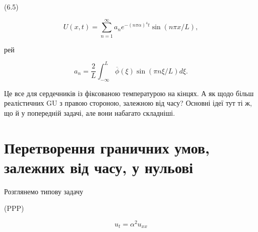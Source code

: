 \documentclass[
  ukrainian,
]{article}
\begin{document}
(6.5)

\[
U(x, t) = \sum_{n=1}^{\infty} a_n e^{-(n\pi\alpha)^4 t} \sin(n\pi x/L),
\]

рей

\[
a_n = \frac{2}{L} \int_{-\infty}^{L} \overline{\phi}(\xi) \sin(\pi n\xi/L) d\xi.
\]

Це все для сердечників із фіксованою температурою на кінцях. А як щодо
більш реалістичних GU з правою стороною, залежною від часу? Основні ідеї
тут ті ж, що й у попередній задачі, але вони набагато складніші.

\section{Перетворення граничних умов, залежних від часу, у
нульові}\label{ux43fux435ux440ux435ux442ux432ux43eux440ux435ux43dux43dux44f-ux433ux440ux430ux43dux438ux447ux43dux438ux445-ux443ux43cux43eux432-ux437ux430ux43bux435ux436ux43dux438ux445-ux432ux456ux434-ux447ux430ux441ux443-ux443-ux43dux443ux43bux44cux43eux432ux456}

Розглянемо типову задачу

(PPP)

\[
u_t = \alpha^2 u_{xx}
\]
\end{document}
